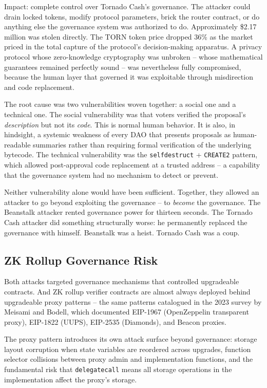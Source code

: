 \documentclass[
  11pt,
  openany]{report}
\begin{document}
Impact: complete control over Tornado Cash's governance. The attacker could
drain locked tokens, modify protocol parameters, brick the router contract, or
do anything else the governance system was authorized to do. Approximately
\$2.17 million was stolen directly. The TORN token price dropped 36\% as the
market priced in the total capture of the protocol's decision-making apparatus.
A privacy protocol whose zero-knowledge cryptography was unbroken -- whose
mathematical guarantees remained perfectly sound -- was nevertheless fully
compromised, because the human layer that governed it was exploitable through
misdirection and code replacement.

The root cause was two vulnerabilities woven together: a social one and a
technical one. The social vulnerability was that voters verified the proposal's
\emph{description} but not its \emph{code}. This is normal human behavior. It is
also, in hindsight, a systemic weakness of every DAO that presents proposals as
human-readable summaries rather than requiring formal verification of the
underlying bytecode. The technical vulnerability was the \texttt{selfdestruct} +
\texttt{CREATE2} pattern, which allowed post-approval code replacement at a
trusted address -- a capability that the governance system had no mechanism to
detect or prevent.

Neither vulnerability alone would have been sufficient. Together, they allowed
an attacker to go beyond exploiting the governance -- to \emph{become} the
governance. The Beanstalk attacker rented governance power for thirteen seconds.
The Tornado Cash attacker did something structurally worse: he permanently
replaced the governance with himself. Beanstalk was a heist. Tornado Cash was a
coup.

\subsection{ZK Rollup Governance Risk}\label{zk-rollup-governance-risk}

Both attacks targeted governance mechanisms that controlled upgradeable
contracts. And ZK rollup verifier contracts are almost always deployed behind
upgradeable proxy patterns -- the same patterns catalogued in the 2023 survey by
Meisami and Bodell, which documented EIP-1967 (OpenZeppelin transparent proxy),
EIP-1822 (UUPS), EIP-2535 (Diamonds), and Beacon proxies.

The proxy pattern introduces its own attack surface beyond governance: storage
layout corruption when state variables are reordered across upgrades, function
selector collisions between proxy admin and implementation functions, and the
fundamental risk that \texttt{delegatecall} means all storage operations in the
implementation affect the proxy's storage.
\end{document}
